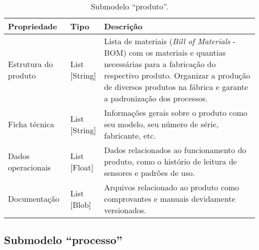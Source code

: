 \begin{table}[htb]
	\centering
	\caption{Submodelo ``produto''.}
	\begin{tabular}{p{3.5cm}p{1.5cm}p{9cm}}
		\hline
		\textbf{Propriedade}
		 & \textbf{Tipo}
		 & \textbf{Descrição}                                                                                                                                                                                                                  \\

		\hline
		Estrutura do produto
		 & \makecell{List\\{[String]}}
		 & Lista de materiais (\textit{Bill of Materials} - BOM) com os materiais e quantias necessárias para a fabricação do respectivo produto. Organizar a produção de diversos produtos na fábrica e garante a padronização dos processos. \\

		\hline
		Ficha técnica
		 & \makecell{List\\{[String]}}
		 & Informações gerais sobre o produto como seu modelo, seu número de série, fabricante, etc.                                                                                                                                           \\

		\hline
		Dados operacionais
		 & \makecell{List\\{[Float]}}
		 & Dados relacionados ao funcionamento do produto, como o histório de leitura de sensores e padrões de uso.                                                                                                                            \\

		\hline
		Documentação
		 & \makecell{List\\{[Blob]}}
		 & Arquivos relacionado ao produto como comprovantes e manuais devidamente versionados.                                                                                                                                                \\

		\hline
	\end{tabular}
	\label{tab:produto-submodelo-produto}
\end{table}

\subsection{Submodelo ``processo''}


